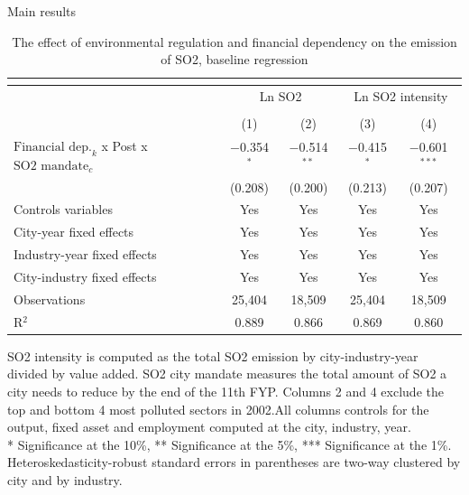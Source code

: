 \documentclass{beamer}
\begin{document}
\begin{frame}{Main results}

    \begin{table}[htbp]\centering
        \begin{adjustbox}{width=\textwidth,
        totalheight=\baselineskip,keepaspectratio}
        \begin{threeparttable}   
        \caption{\small The effect of environmental regulation and financial dependency on the emission of SO2, baseline regression}
        \begin{tabular}{l*{4}{c}}
            \toprule
     
            &\multicolumn{4}{c}{} \\ 
            \hline
            & \multicolumn{2}{c}{Ln SO2} & \multicolumn{2}{c}{Ln SO2 intensity} \\
            \\[-1.8ex] & (1) & (2) & (3) & (4)\\ 
            \hline 
            $\text{Financial dep.}_k$ x Post x $\text{SO2 mandate}_c$ & $-$0.354$^{*}$ & $-$0.514$^{**}$ & $-$0.415$^{*}$ & $-$0.601$^{***}$ \\ 
            & (0.208) & (0.200) & (0.213) & (0.207)  \\
            \midrule
            Controls variables & Yes & Yes & Yes & Yes \\ 
            City-year fixed effects & Yes & Yes & Yes & Yes \\ 
            Industry-year fixed effects & Yes & Yes & Yes & Yes \\ 
            City-industry fixed effects & Yes & Yes & Yes & Yes \\ 
            Observations & 25,404 & 18,509 & 25,404 & 18,509 \\ 
            R$^{2}$ & 0.889 & 0.866 & 0.869 & 0.860 \\  
            \bottomrule
        \end{tabular}
        \begin{tablenotes}
        \scriptsize
            \item SO2 intensity is computed as the total SO2 emission by city-industry-year divided by value added. SO2 city mandate measures the total amount of SO2 a city needs to reduce by the end of the 11th FYP. Columns 2 and 4 exclude the top and bottom 4 most polluted sectors in 2002.All columns controls for the output, fixed asset and employment computed at the city, industry, year. \\
            * Significance at the 10\%, ** Significance at the 5\%, *** Significance at the 1\%. Heteroskedasticity-robust standard errors in parentheses are two-way clustered by city and by industry.
        \end{tablenotes}
        \end{threeparttable}
        \end{adjustbox}
    \end{table}
\end{frame}
\end{document}
